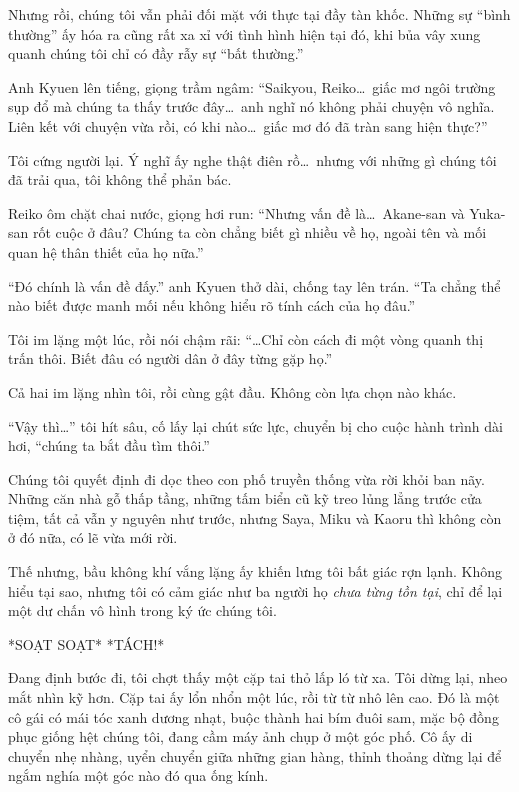 \documentclass[../main.tex]{subfiles}
\begin{document}
Nhưng rồi, chúng tôi vẫn phải đối mặt với thực tại đầy tàn khốc. Những sự ``bình thường'' ấy hóa ra cũng rất xa xỉ với tình hình hiện tại đó, khi bủa vây xung quanh chúng tôi chỉ có đầy rẫy sự ``bất thường.''

Anh Kyuen lên tiếng, giọng trầm ngâm: ``Saikyou, Reiko\dots\ giấc mơ ngôi trường sụp đổ mà chúng ta thấy trước đây\dots\ anh nghĩ nó không phải chuyện vô nghĩa. Liên kết với chuyện vừa rồi, có khi nào\dots\ giấc mơ đó đã tràn sang hiện thực?''

Tôi cứng người lại. Ý nghĩ ấy nghe thật điên rồ\dots\ nhưng với những gì chúng tôi đã trải qua, tôi không thể phản bác.

Reiko ôm chặt chai nước, giọng hơi run: ``Nhưng vấn đề là\dots\ Akane-san và Yuka-san rốt cuộc ở đâu? Chúng ta còn chẳng biết gì nhiều về họ, ngoài tên và mối quan hệ thân thiết của họ nữa.''

``Đó chính là vấn đề đấy.'' anh Kyuen thở dài, chống tay lên trán. ``Ta chẳng thể nào biết được manh mối nếu không hiểu rõ tính cách của họ đâu.''

Tôi im lặng một lúc, rồi nói chậm rãi: ``\dots Chỉ còn cách đi một vòng quanh thị trấn thôi. Biết đâu có người dân ở đây từng gặp họ.''

Cả hai im lặng nhìn tôi, rồi cùng gật đầu. Không còn lựa chọn nào khác.

``Vậy thì\dots'' tôi hít sâu, cố lấy lại chút sức lực, chuyển bị cho cuộc hành trình dài hơi, ``chúng ta bắt đầu tìm thôi.''

\ct

Chúng tôi quyết định đi dọc theo con phố truyền thống vừa rời khỏi ban nãy. Những căn nhà gỗ thấp tầng, những tấm biển cũ kỹ treo lủng lẳng trước cửa tiệm, tất cả vẫn y nguyên như trước, nhưng Saya, Miku và Kaoru thì không còn ở đó nữa, có lẽ vừa mới rời.

Thế nhưng, bầu không khí vắng lặng ấy khiến lưng tôi bất giác rợn lạnh. Không hiểu tại sao, nhưng tôi có cảm giác như ba người họ \emph{chưa từng tồn tại}, chỉ để lại một dư chấn vô hình trong ký ức chúng tôi.

*SOẠT SOẠT* *TÁCH!*

Đang định bước đi, tôi chợt thấy một cặp tai thỏ lấp ló từ xa. Tôi dừng lại, nheo mắt nhìn kỹ hơn. Cặp tai ấy lổn nhổn một lúc, rồi từ từ nhô lên cao. Đó là một cô gái có mái tóc xanh dương nhạt, buộc thành hai bím đuôi sam, mặc bộ đồng phục giống hệt chúng tôi, đang cầm máy ảnh chụp ở một góc phố. Cô ấy di chuyển nhẹ nhàng, uyển chuyển giữa những gian hàng, thỉnh thoảng dừng lại để ngắm nghía một góc nào đó qua ống kính.
\end{document}
